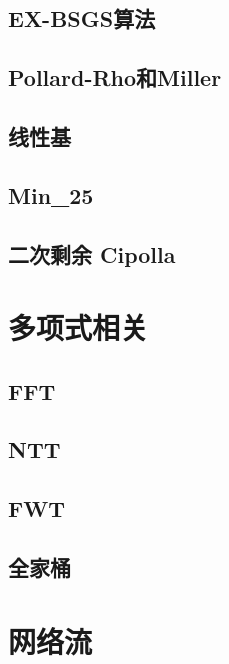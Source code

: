 \documentclass[a4paper,12pt]{article}
\begin{document}
\subsection{EX-BSGS算法}

\subsection{Pollard-Rho和Miller}

\subsection{线性基}



\subsection{Min\_25}

\subsection{二次剩余 Cipolla}


\section{多项式相关}

\subsection{FFT}

\subsection{NTT}

\subsection{FWT}

\subsection{全家桶}


\section{网络流}
\end{document}
